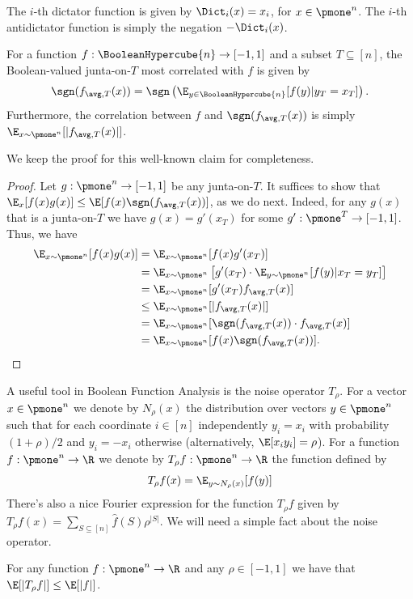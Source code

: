 %
%
%
\begin{definition}
The $i$-th dictator function is given by $\Dict_i(x) = x_i$, for $x \in \pmone^n$. The $i$-th antidictator function is simply the negation $-\Dict_i(x)$.
\end{definition}
%
%
\begin{claim}
\label{claim:maximum-correlation-junta}
For a function $f:\BooleanHypercube{n} \to [-1,1]$ and a subset $T \subseteq [n]$, 
the Boolean-valued junta-on-$T$ most correlated with $f$ is given by
$$
\sgn(f_{\avg, T}(x)) = \sgn\left(\E_{y \in \BooleanHypercube{n}}[f(y)|y_T = x_T]\right).
$$
Furthermore, the correlation between $f$ and $\sgn(f_{\avg, T}(x))$ is simply
$\E_{x\sim \pmone^n}[|f_{\avg,T}(x)|]$.
\end{claim}
We keep the proof for this well-known claim for completeness.
\begin{proof}
Let $g: \pmone^n \to [-1,1]$ be any junta-on-$T$.
It suffices to show that $\E_x[f(x)g(x)] \le \E[f(x) \sgn(f_{\avg, T}(x))]$, as we do next.
Indeed, for any $g(x)$ that is a junta-on-$T$ we have $g(x) = g'(x_T)$ for some $g': \pmone^T \to [-1,1]$. Thus, we have
\begin{align*}
\E_{x\sim \pmone^n}[f(x)g(x)] &=
\E_{x\sim \pmone^n}[f(x)g'(x_T)]\\
&= \E_{x \sim \pmone^n}\left[g'(x_T) \cdot \E_{y \sim \pmone^n}[f(y)|x_T=y_T]\right]\\
&= \E_{x \sim \pmone^n}[g'(x_T) f_{\avg,T}(x)]\\
&\le  \E_{x \sim \pmone^n}[|f_{\avg,T}(x)|]\\
&= \E_{x \sim \pmone^n}[\sgn(f_{\avg,T}(x)) \cdot f_{\avg,T}(x)]\\
 &= \E_{x\sim \pmone^n}[f(x)\sgn(f_{\avg,T}(x))].\qedhere
\end{align*}



%
%
%
%
%
%
%
\end{proof}

%


A useful tool in  Boolean Function Analysis is the noise operator $T_{\rho}$.
For a vector $x \in \pmone^n$ we denote by $N_{\rho}(x)$ the distribution over vectors $y\in \pmone^n$ such that for each coordinate $i\in [n]$ independently $y_i = x_i$ with probability $(1+\rho)/2$ and  $y_i = -x_i$ otherwise (alternatively, $\E[x_i y_i] = \rho$).
For a function $f: \pmone^n \to \R$ we denote by $T_{\rho}f: \pmone^n \to \R$ the function defined by
$$T_{\rho}f(x) = \E_{y\sim N_{\rho}(x)}[ f(y)]$$
There's also a nice Fourier expression for the function $T_{\rho}f$ given by $T_{\rho}f(x) = \sum_{S \subseteq [n]} \hat{f}(S) \rho^{|S|}$.
We will need a simple fact about the noise operator.
\begin{fact}
\label{fact:noise-op-l1-norm}
For any function $f:\pmone^n \to \R$ and any $\rho \in [-1,1]$ we have that $\E[|T_{\rho}f|] \le \E[|f|]$.
\end{fact}
%
%
%
%
%


